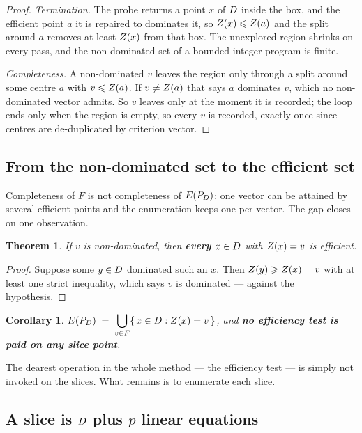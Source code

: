 \documentclass[11pt,a4paper]{article}
\newtheorem{theorem}{Theorem}
\newtheorem{corollary}{Corollary}
\begin{document}
\begin{proof}
\emph{Termination.}  The probe returns a point $x$ of $D$ inside the box,
and the efficient point $a$ it is repaired to dominates it, so
$Z(x) \leqslant Z(a)$ and the split around $a$ removes at least $Z(x)$ from
that box.  The unexplored region shrinks on every pass, and the non-dominated
set of a bounded integer program is finite.

\emph{Completeness.}  A non-dominated $v$ leaves the region only through a
split around some centre $a$ with $v \leqslant Z(a)$.  If $v \neq Z(a)$ that
says $a$ dominates $v$, which no non-dominated vector admits.  So $v$ leaves
only at the moment it is recorded; the loop ends only when the region is empty,
so every $v$ is recorded, exactly once since centres are de-duplicated by
criterion vector.
\end{proof}

\subsection{From the non-dominated set to the efficient set}

Completeness of $F$ is not completeness of $E(P_{D})$: one vector can be attained by
several efficient points and the enumeration keeps one per vector.  The gap
closes on one observation.

\begin{theorem}\label{thm:slice}
If $v$ is non-dominated, then \textbf{every} $x \in D$ with $Z(x) = v$ is
efficient.
\end{theorem}

\begin{proof}
Suppose some $y \in D$ dominated such an $x$.  Then
$Z(y) \geqslant Z(x) = v$ with at least one strict inequality, which says $v$
is dominated --- against the hypothesis.
\end{proof}

\begin{corollary}\label{cor:union}
$\displaystyle E(P_{D}) \;=\; \bigcup_{v \in F} \{\, x \in D : Z(x) = v \,\}$,
and \textbf{no efficiency test is paid on any slice point}.
\end{corollary}

\noindent
The dearest operation in the whole method --- the efficiency test --- is simply
not invoked on the slices.  What remains is to enumerate each slice.

\subsection{\texorpdfstring{A slice is $D$ plus $p$ linear equations}{A slice is D plus p linear equations}}
\label{sec:elim}
\end{document}
